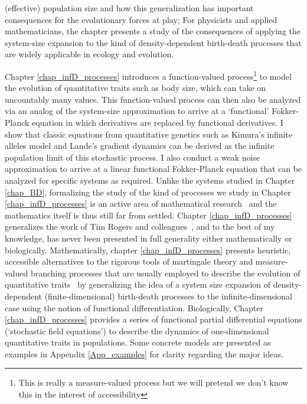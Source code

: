 (effective) population size and how this generalization has important consequences for the evolutionary forces at play; For physicists and applied mathematicians, the chapter presents a study of the consequences of applying the system-size expansion to the kind of density-dependent birth-death processes that are widely applicable in ecology and evolution.

Chapter \ref{chap_infD_processes} introduces a function-valued process\footnote{This is really a measure-valued process but we will pretend we don't know this in the interest of accessibility} to model the evolution of quantitative traits such as body size, which can take on uncountably many values. This function-valued process can then also be analyzed via an analog of the system-size approximation to arrive at a `functional' Fokker-Planck equation in which derivatives are replaced by functional derivatives. I show that classic equations from quantitative genetics such as Kimura's infinite alleles model and Lande's gradient dynamics can be derived as the infinite population limit of this stochastic process. I also conduct a weak noise approximation to arrive at a linear functional Fokker-Planck equation that can be analyzed for specific systems as required. Unlike the systems studied in Chapter \ref{chap_BD}, formalizing the study of the kind of processes we study in Chapter \ref{chap_infD_processes} is an active area of mathematical research~\citep{walsh_introduction_1986,carmona_stochastic_1999,da_prato_stochastic_2014,balan_gentle_2018} and the mathematics itself is thus still far from settled. Chapter \ref{chap_infD_processes} generalizes the work of Tim Rogers and colleagues~\citep{rogers_demographic_2012,rogers_spontaneous_2012,rogers_modes_2015}, and to the best of my knowledge, has never been presented in full generality either mathematically or biologically. Mathematically, chapter \ref{chap_infD_processes} presents heuristic, accessible alternatives to the rigorous tools of martingale theory and measure-valued branching processes that are usually employed to describe the evolution of quantitative traits~\citep{champagnat_unifying_2006,etheridge_mathematical_2011, week_white_2021} by generalizing the idea of a system size expansion of density-dependent (finite-dimensional) birth-death processes to the infinite-dimensional case using the notion of functional differentiation. Biologically, Chapter \ref{chap_infD_processes} provides a series of functional partial differential equations (`stochastic field equations') to describe the dynamics of one-dimensional quantitative traits in populations. Some concrete models are presented as examples in Appendix \ref{App_examples} for clarity regarding the major ideas.

